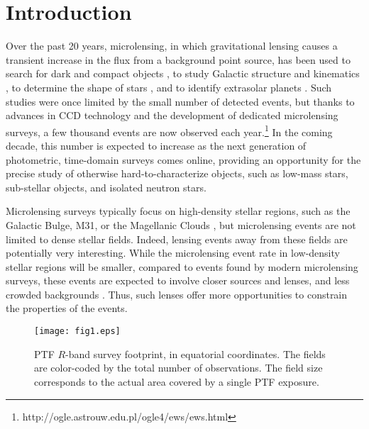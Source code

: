 \documentclass{emulateapj}
\begin{document}
\section{Introduction}
Over the past 20 years, microlensing, in which gravitational lensing causes a transient increase in the flux from a background point source, has been used to search for dark and compact objects \citep{original_macho, oslowski2008, sartore2010}, to study Galactic structure and kinematics \citep{binney2000}, to determine the shape of stars \citep{rattenbury2005}, and to identify extrasolar planets \citep[][and references therein]{gaudi2011}. Such studies were once limited by the small number of detected events, but thanks to advances in CCD technology and the development of dedicated microlensing surveys, a few thousand events are now observed each year.\footnote{http://ogle.astrouw.edu.pl/ogle4/ews/ews.html} In the coming decade, this number is expected to increase as the next generation of photometric, time-domain surveys comes online, providing an opportunity for the precise study of otherwise hard-to-characterize objects, such as low-mass stars, sub-stellar objects, and isolated neutron stars. 

Microlensing surveys typically focus on high-density stellar regions, such as the Galactic Bulge, M31, or the Magellanic Clouds \citep[e.g.,][]{original_ogle, original_macho, eros_original, crotts1996}, but microlensing events are not limited to dense stellar fields. Indeed, lensing events away from these fields are potentially very interesting. While the microlensing event rate in low-density stellar regions will be smaller, compared to events found by modern microlensing surveys, these events are expected to involve closer sources and lenses, and less crowded backgrounds \citep{mesolensing}. Thus, such lenses offer more opportunities to constrain the properties of the events.

\begin{figure*}[!t]
\centering\texttt{[image: fig1.eps]}
\caption{PTF $R$-band survey footprint, in equatorial coordinates. The fields are color-coded by the total number of observations. The field size corresponds to the actual area covered by a single PTF exposure.}\label{fig:survey_footprint}
\end{figure*}	
\end{document}
